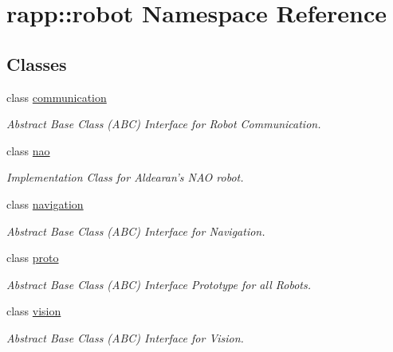 \hypertarget{namespacerapp_1_1robot}{\section{rapp\-:\-:robot Namespace Reference}
\label{namespacerapp_1_1robot}
}
\subsection*{Classes}
\begin{DoxyCompactItemize}
\item 
class \hyperlink{classrapp_1_1robot_1_1communication}{communication}
\begin{DoxyCompactList}\small\item\em Abstract Base Class (A\-B\-C) Interface for Robot Communication. \end{DoxyCompactList}\item 
class \hyperlink{classrapp_1_1robot_1_1nao}{nao}
\begin{DoxyCompactList}\small\item\em Implementation Class for Aldearan's N\-A\-O robot. \end{DoxyCompactList}\item 
class \hyperlink{classrapp_1_1robot_1_1navigation}{navigation}
\begin{DoxyCompactList}\small\item\em Abstract Base Class (A\-B\-C) Interface for Navigation. \end{DoxyCompactList}\item 
class \hyperlink{classrapp_1_1robot_1_1proto}{proto}
\begin{DoxyCompactList}\small\item\em Abstract Base Class (A\-B\-C) Interface Prototype for all Robots. \end{DoxyCompactList}\item 
class \hyperlink{classrapp_1_1robot_1_1vision}{vision}
\begin{DoxyCompactList}\small\item\em Abstract Base Class (A\-B\-C) Interface for Vision. \end{DoxyCompactList}\end{DoxyCompactItemize}
